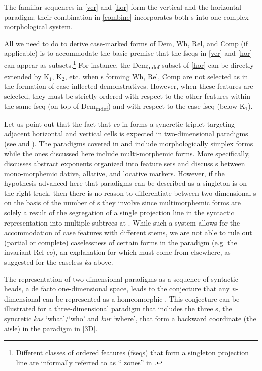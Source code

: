  The familiar sequences in \ref{ver} and \ref{hor} form the vertical and the horizontal paradigm; their combination in \ref{combine} incorporates both s into one complex morphological system.
 \par
 All we need to do to derive case-marked forms of Dem, Wh, Rel, and Comp (if applicable) is to accommodate the basic premise that the fseqs in \ref{ver} and \ref{hor} can appear as subsets.\footnote{Different classes of ordered features (fseqs) that form a singleton projection line are informally referred to as `` zones'' in \citet{LTN,NU}. 
} %
For instance, the Dem\textsubscript{indef} subset of \ref{hor} can be directly extended by K$_{1}$, K$_{2}$, etc. when s forming Wh, Rel, Comp are not selected as in the formation of case-inflected demonstratives. However, when these features are selected, they must be strictly ordered with respect to the other features within  the same fseq (on top of Dem\textsubscript{indef}) and with respect to the case fseq (below K$_{1}$).
\par
Let us point out that the fact that \textit{co} in  forms a syncretic triplet targeting adjacent horizontal and vertical cells is expected in two-dimensional paradigms (see \citealt{TaraldsenNELS} and \citealt{CahaPantcheva2012}). The paradigms covered in \cite{TaraldsenNELS} and \cite{CahaPantcheva2012} include morphologically simplex forms while the ones discussed here include multi-morphemic forms. More specifically, \cite{TaraldsenNELS} discusses abstract exponents organized into feature sets and \cite{CahaPantcheva2012} discuss s between mono-morphemic dative, allative, and locative markers. However, if the hypothesis advanced here that paradigms can be described as a singleton  is on the right track, then there is no reason to differentiate between two-dimensional s on the basis of the number of s they involve since multimorphemic forms are solely a result of the segregation of a single  projection line in the syntactic representation into multiple subtrees at . 
While such a system allows for the accommodation of case features with different stems, we are not able to rule out (partial or complete) caselessness of certain forms in the paradigm (e.g. the  invariant Rel \textit{co}), an explanation for which must come from elsewhere, as suggested for the  caseless \textit{ka} above.
\par
The representation of two-dimensional paradigms as a
sequence of syntactic heads, a de facto one-dimensional space, leads to the conjecture that any \textit{n}-dimensional  can be represented as a homeomorphic . This conjecture can be illustrated for a three-dimensional paradigm that includes the three  s, the syncretic \textit{kas} `what'/`who' and \textit{kur} `where', that form a backward coordinate (the aisle) in the paradigm in \ref{3D}. 

